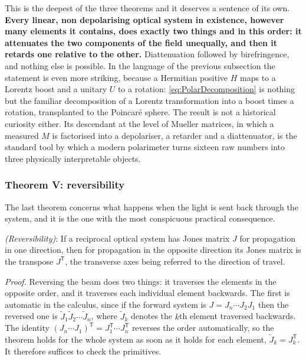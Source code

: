             This is the deepest of the three theorems and it deserves a sentence of its own. \textbf{Every linear, non depolarising optical system in existence, however many elements it contains, does exactly two things and in this order: it attenuates the two components of the field unequally, and then it retards one relative to the other.} Diattenuation followed by birefringence, and nothing else is possible. In the language of the previous subsection the statement is even more striking, because a Hermitian positive $H$ maps to a Lorentz boost and a unitary $U$ to a rotation: \ref{eq:PolarDecomposition} is nothing but the familiar decomposition of a Lorentz transformation into a boost times a rotation, transplanted to the Poincaré sphere. The result is not a historical curiosity either. Its descendant at the level of Mueller matrices, in which a measured $M$ is factorised into a depolariser, a retarder and a diattenuator, is the standard tool by which a modern polarimeter turns sixteen raw numbers into three physically interpretable objects.

        \subsubsection{Theorem V: reversibility}

            The last theorem concerns what happens when the light is sent back through the system, and it is the one with the most conspicuous practical consequence.

            \begin{myteo}
                \textit{(Reversibility)}: If a reciprocal optical system has Jones matrix $J$ for propagation in one direction, then for propagation in the opposite direction its Jones matrix is the transpose $J^{\mathsf{T}}$, the transverse axes being referred to the direction of travel.
            \end{myteo}

            \textit{Proof.} Reversing the beam does two things: it traverses the elements in the opposite order, and it traverses each individual element backwards. The first is automatic in the calculus, since if the forward system is $J=J_n\cdots J_2J_1$ then the reversed one is $\tilde{J}_1\tilde{J}_2\cdots\tilde{J}_n$, where $\tilde{J}_k$ denotes the $k$th element traversed backwards. The identity $\left(J_n\cdots J_1\right)^{\mathsf T}=J_1^{\mathsf T}\cdots J_n^{\mathsf T}$ reverses the order automatically, so the theorem holds for the whole system as soon as it holds for each element, $\tilde{J}_k=J_k^{\mathsf T}$. It therefore suffices to check the primitives.

